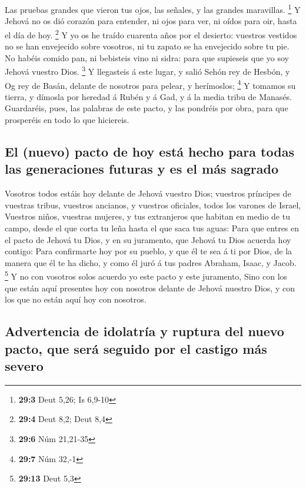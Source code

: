 Las pruebas grandes que vieron tus ojos, las señales, y las
grandes maravillas. \footnote{\textbf{29:3} Deut 5,26; Is 6,9-10}
 Y Jehová no os dió corazón para entender, ni ojos para ver,
ni oídos para oir, hasta el día de hoy. \footnote{\textbf{29:4} Deut
  8,2; Deut 8,4}  Y yo os he traído cuarenta años por el
desierto: vuestros vestidos no se han envejecido sobre vosotros, ni tu
zapato se ha envejecido sobre tu pie.  No habéis comido pan,
ni bebisteis vino ni sidra: para que supieseis que yo soy Jehová vuestro
Dios. \footnote{\textbf{29:6} Núm 21,21-35}  Y llegasteis á
este lugar, y salió Sehón rey de Hesbón, y Og rey de Basán, delante de
nosotros para pelear, y herímoslos; \footnote{\textbf{29:7} Núm 32,-1}
 Y tomamos su tierra, y dímosla por heredad á Rubén y á Gad,
y á la media tribu de Manasés.  Guardaréis, pues, las
palabras de este pacto, y las pondréis por obra, para que prosperéis en
todo lo que hiciereis.

\hypertarget{el-nuevo-pacto-de-hoy-estuxe1-hecho-para-todas-las-generaciones-futuras-y-es-el-muxe1s-sagrado}{%
\subsection{El (nuevo) pacto de hoy está hecho para todas las
generaciones futuras y es el más
sagrado}\label{el-nuevo-pacto-de-hoy-estuxe1-hecho-para-todas-las-generaciones-futuras-y-es-el-muxe1s-sagrado}}

 Vosotros todos estáis hoy delante de Jehová vuestro Dios;
vuestros príncipes de vuestras tribus, vuestros ancianos, y vuestros
oficiales, todos los varones de Israel,  Vuestros niños,
vuestras mujeres, y tus extranjeros que habitan en medio de tu campo,
desde el que corta tu leña hasta el que saca tus aguas: 
Para que entres en el pacto de Jehová tu Dios, y en su juramento, que
Jehová tu Dios acuerda hoy contigo:  Para confirmarte hoy
por su pueblo, y que él te sea á ti por Dios, de la manera que él te ha
dicho, y como él juró á tus padres Abraham, Isaac, y Jacob. \footnote{\textbf{29:13}
  Deut 5,3}  Y no con vosotros solos acuerdo yo este pacto
y este juramento,  Sino con los que están aquí presentes
hoy con nosotros delante de Jehová nuestro Dios, y con los que no están
aquí hoy con nosotros.

\hypertarget{advertencia-de-idolatruxeda-y-ruptura-del-nuevo-pacto-que-seruxe1-seguido-por-el-castigo-muxe1s-severo}{%
\subsection{Advertencia de idolatría y ruptura del nuevo pacto, que será
seguido por el castigo más
severo}\label{advertencia-de-idolatruxeda-y-ruptura-del-nuevo-pacto-que-seruxe1-seguido-por-el-castigo-muxe1s-severo}}

